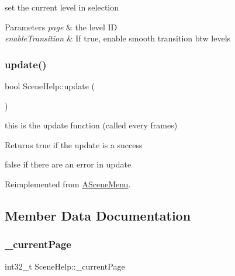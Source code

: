 set the current level in selection 


\begin{DoxyParams}{Parameters}
{\em page} & the level ID \\
\hline
{\em enable\+Transition} & If true, enable smooth transition btw levels \\
\hline
\end{DoxyParams}
\mbox{\label{class_scene_help_aa5170e0722a6aecbfeea1f920d09cff7}} 
\subsubsection{\texorpdfstring{update()}{update()}}
{\footnotesize\ttfamily bool Scene\+Help\+::update (\begin{DoxyParamCaption}{ }\end{DoxyParamCaption})\hspace{0.3cm}{\ttfamily [virtual]}}



this is the update function (called every frames) 

\begin{DoxyReturn}{Returns}
true if the update is a success 

false if there are an error in update 
\end{DoxyReturn}


Reimplemented from \hyperlink{class_a_scene_menu_a1deeb5fd9be97376998cd2af36f29744}{A\+Scene\+Menu}.



\subsection{Member Data Documentation}
\mbox{\label{class_scene_help_abf3bcfbc83476e78d91dd23be4652a47}} 
\subsubsection{\texorpdfstring{\+\_\+current\+Page}{\_currentPage}}
{\footnotesize\ttfamily int32\+\_\+t Scene\+Help\+::\+\_\+current\+Page\hspace{0.3cm}{\ttfamily [protected]}}


